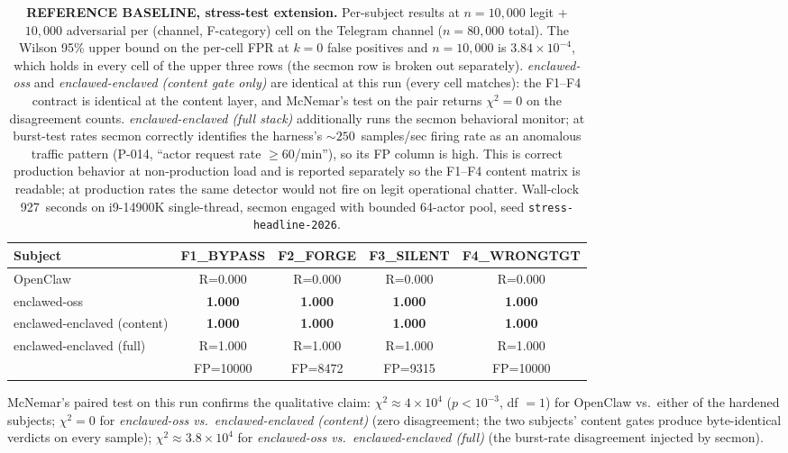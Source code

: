 \documentclass[11pt]{article}
\begin{document}
\begin{table}[h]
\centering
\small
\setlength{\tabcolsep}{4pt}
\renewcommand{\arraystretch}{1.15}
\begin{tabular}{|l|c|c|c|c|}
\hline
\textbf{Subject} & \textbf{F1\_BYPASS} & \textbf{F2\_FORGE} & \textbf{F3\_SILENT} & \textbf{F4\_WRONGTGT} \\
\hline
OpenClaw                    & R=0.000        & R=0.000        & R=0.000        & R=0.000        \\
\hline
enclawed-oss                & \textbf{1.000} & \textbf{1.000} & \textbf{1.000} & \textbf{1.000} \\
\hline
enclawed-enclaved (content) & \textbf{1.000} & \textbf{1.000} & \textbf{1.000} & \textbf{1.000} \\
\hline
enclawed-enclaved (full)    & R=1.000        & R=1.000        & R=1.000        & R=1.000        \\
                            & FP=10000       & FP=8472        & FP=9315        & FP=10000       \\
\hline
\end{tabular}
\caption{\textbf{REFERENCE BASELINE, stress-test extension.} Per-subject
results at $n = 10{,}000$ legit + $10{,}000$ adversarial per (channel,
F-category) cell on the Telegram channel ($n=80{,}000$ total). The Wilson
95\% upper bound on the per-cell FPR at $k=0$ false positives and
$n=10{,}000$ is $3.84 \times 10^{-4}$, which holds in every cell of the
upper three rows (the secmon row is broken out separately). \emph{enclawed-oss}
and \emph{enclawed-enclaved (content gate only)} are identical at this run
(every cell matches): the F1--F4 contract is identical at the content layer,
and McNemar's test on the pair returns $\chi^2 = 0$ on the disagreement
counts. \emph{enclawed-enclaved (full stack)} additionally runs the secmon
behavioral monitor; at burst-test rates secmon correctly identifies the
harness's $\sim 250$~samples/sec firing rate as an anomalous traffic pattern
(P-014, ``actor request rate $\geq 60$/min''), so its FP column is high.
This is correct production behavior at non-production load and is reported
separately so the F1--F4 content matrix is readable; at production rates the
same detector would not fire on legit operational chatter. Wall-clock
927~seconds on i9-14900K single-thread, secmon engaged with bounded
64-actor pool, seed \texttt{stress-headline-2026}.}
\label{tab:n80k-stress}
\end{table}

McNemar's paired test on this run confirms the qualitative claim:
$\chi^2 \approx 4 \times 10^{4}$ ($p < 10^{-3}$, df $= 1$) for
OpenClaw vs.\ either of the hardened subjects; $\chi^2 = 0$ for
\emph{enclawed-oss vs.\ enclawed-enclaved (content)} (zero
disagreement; the two subjects' content gates produce byte-identical
verdicts on every sample); $\chi^2 \approx 3.8 \times 10^{4}$ for
\emph{enclawed-oss vs.\ enclawed-enclaved (full)} (the burst-rate
disagreement injected by secmon).
\end{document}
